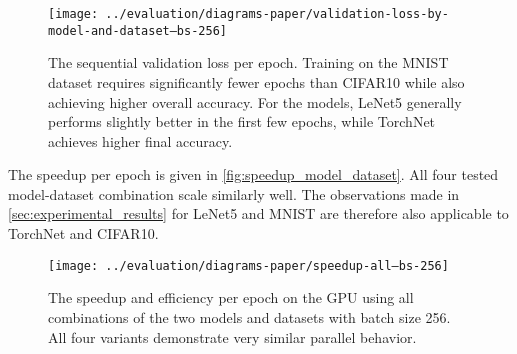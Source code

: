 \documentclass[conference]{IEEEtran}
\begin{document}
\begin{figure}[ht]
\centering
\texttt{[image: ../evaluation/diagrams-paper/validation-loss-by-model-and-dataset--bs-256]}
\caption{The sequential validation loss per epoch.
Training on the MNIST dataset requires significantly fewer epochs than CIFAR10 while also achieving higher overall accuracy.
For the models, LeNet5 generally performs slightly better in the first few epochs, while TorchNet achieves higher final accuracy.}
\label{fig:validation_loss_model_dataset}
\end{figure}

The speedup per epoch is given in \autoref{fig:speedup_model_dataset}.
All four tested model-dataset combination scale similarly well.
The observations made in \autoref{sec:experimental_results} for LeNet5 and MNIST are therefore also applicable to TorchNet and CIFAR10.

\begin{figure}[!ht]
\centering
\texttt{[image: ../evaluation/diagrams-paper/speedup-all--bs-256]}
\caption{The speedup and efficiency per epoch on the GPU using all combinations of the two models and datasets with batch size 256.
All four variants demonstrate very similar parallel behavior.}
\label{fig:speedup_model_dataset}
\end{figure}
\end{document}
